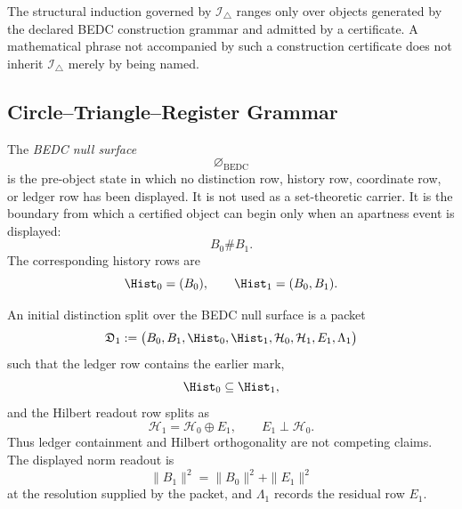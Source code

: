 \begin{principle}
\label{prin:unified-reality-certificate-bounded-domain-induction}
The structural induction governed by
$\mathcal I_{\triangle}$ ranges only over objects generated by the
declared BEDC construction grammar and admitted by a certificate. A
mathematical phrase not accompanied by such a construction certificate
does not inherit $\mathcal I_{\triangle}$ merely by being named.
\end{principle}

\subsection{Circle--Triangle--Register Grammar}
\label{subsec:unified-reality-circle-triangle-register-grammar}

\begin{definition}
\label{def:unified-reality-bedc-null-surface}
The \emph{BEDC null surface}
$$
\varnothing_{\mathrm{BEDC}}
$$
is the pre-object state in which no distinction row, history row,
coordinate row, or ledger row has been displayed. It is not used as a
set-theoretic carrier. It is the boundary from which a certified object
can begin only when an apartness event is displayed:
$$
B_0\#B_1.
$$
The corresponding history rows are
$$
\Hist_0=(B_0),
\qquad
\Hist_1=(B_0,B_1).
$$
\end{definition}

\begin{definition}
\label{def:unified-reality-initial-distinction-split}
An initial distinction split over the BEDC null surface is a packet
$$
\mathfrak D_1
:=
\bigl(B_0,B_1,\Hist_0,\Hist_1,\mathcal H_0,\mathcal H_1,E_1,\Lambda_1\bigr)
$$
such that the ledger row contains the earlier mark,
$$
\Hist_0\subseteq\Hist_1,
$$
and the Hilbert readout row splits as
$$
\mathcal H_1
=
\mathcal H_0\oplus E_1,
\qquad
E_1\perp\mathcal H_0.
$$
Thus ledger containment and Hilbert orthogonality are not competing
claims. The displayed norm readout is
$$
\|B_1\|^2
=
\|B_0\|^2+\|E_1\|^2
$$
at the resolution supplied by the packet, and $\Lambda_1$ records the
residual row $E_1$.
\end{definition}

